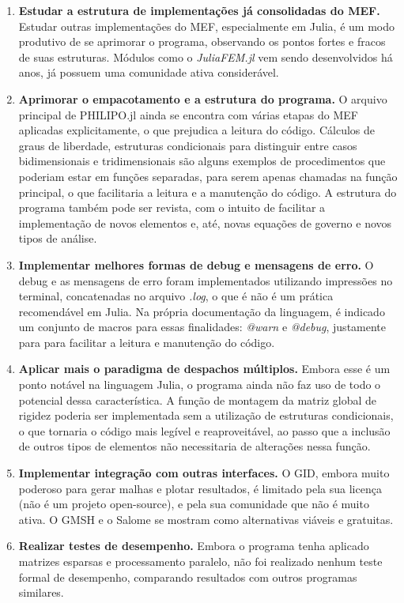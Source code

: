 \begin{enumerate}
    \item \textbf{Estudar a estrutura de implementações já consolidadas do MEF.} Estudar outras implementações do MEF, especialmente em Julia, é um modo produtivo de se aprimorar o programa, observando os pontos fortes e fracos de suas estruturas. Módulos como o \emph{JuliaFEM.jl} vem sendo desenvolvidos há anos, já possuem uma comunidade ativa considerável.
    \item \textbf{Aprimorar o empacotamento e a estrutura do programa.} O arquivo principal de PHILIPO.jl ainda se encontra com várias etapas do MEF aplicadas explicitamente, o que prejudica a leitura do código. Cálculos de graus de liberdade, estruturas condicionais para distinguir entre casos bidimensionais e tridimensionais são alguns exemplos de procedimentos que poderiam estar em funções separadas, para serem apenas chamadas na função principal, o que facilitaria a leitura e a manutenção do código. A estrutura do programa também pode ser revista, com o intuito de facilitar a implementação de novos elementos e, até, novas equações de governo e novos tipos de análise.
    \item \textbf{Implementar melhores formas de debug e mensagens de erro.} O debug e as mensagens de erro foram implementados utilizando impressões no terminal, concatenadas no arquivo \emph{.log}, o que é não é um prática recomendável em Julia. Na própria documentação da linguagem, é indicado um conjunto de macros para essas finalidades: \emph{@warn} e \emph{@debug}, justamente para para facilitar a leitura e manutenção do código.
    \item \textbf{Aplicar mais o paradigma de despachos múltiplos.} Embora esse é um ponto notável na linguagem Julia, o programa ainda não faz uso de todo o potencial dessa característica. A função de montagem da matriz global de rigidez poderia ser implementada sem a utilização de estruturas condicionais, o que tornaria o código mais legível e reaproveitável, ao passo que a inclusão de outros tipos de elementos não necessitaria de alterações nessa função.
    \item \textbf{Implementar integração com outras interfaces.} O GID, embora muito poderoso para gerar malhas e plotar resultados, é limitado pela sua licença (não é um projeto open-source), e pela sua comunidade que não é muito ativa. O GMSH e o Salome se mostram como alternativas viáveis e gratuitas.
    \item \textbf{Realizar testes de desempenho.} Embora o programa tenha aplicado matrizes esparsas e processamento paralelo, não foi realizado nenhum teste formal de desempenho, comparando resultados com outros programas similares.

\end{enumerate}
